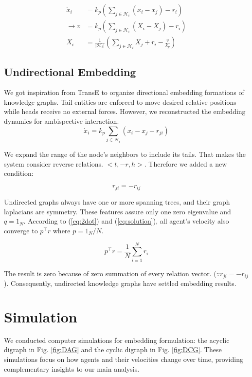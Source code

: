 \documentclass[letterpaper, 10 pt, conference]{ieeeconf}  %
\begin{document}
\begin{equation}
\begin{split}
\dot{x}_i &= k_p(\sum_{j \in \mathcal{H}_i} (x_i - x_j) -r_i) \\
\rightarrow v &= k_p(\sum_{j \in \mathcal{H}_i} (X_i - X_j) - r_i) \\
X_i &= \frac{1}{|\mathcal{H}_i|}(\sum_{j \in \mathcal{H}_i} X_j +r_i-\frac{v}{k_p})
\end{split}
\end{equation}

\subsection{Undirectional Embedding} 
We got inspiration from TransE to organize directional embedding formations of knowledge graphs. Tail entities are enforced to move desired relative positions while heads receive no external forces. However, we 
reconstructed the embedding dynamics for ambispective interaction. 
\begin{equation}
    \dot{x}_i = k_p \sum_{j \in \mathcal{N}_i} (x_i - x_j - r_{ji})
\end{equation}

We expand the range of the node's neighbors to include its tails. That makes the system consider reverse relations. $ <t, -r, h> $. Therefore we added a new condition: 

\[r_{ji} = -r_{ij}\] 

Undirected graphs always have one or more spanning trees, and their graph laplacians are symmetry. These features assure only one zero eigenvalue and $ q = 1_N $. According to (\ref{eq:2dot}) and (\ref{eq:solution}), all agent's velocity also converge to $p^\top r$ where $p = 1_N / N $. 

\[
p^\top r = \frac{1}{N} \sum_{i = 1}^N r_i
\]

\noindent The result is zero because of zero summation of every relation vector. ($\because r_{ji} = -r_{ij}$). Consequently, undirected knowledge graphs have settled embedding results. 

\section{Simulation}
We conducted computer simulations for embedding formulation: the acyclic digraph in Fig. \ref{fig:DAG} and the cyclic digraph in Fig. \ref{fig:DCG}. These simulations focus on how agents and their velocities change over time, providing complementary insights to our main analysis.
\end{document}
